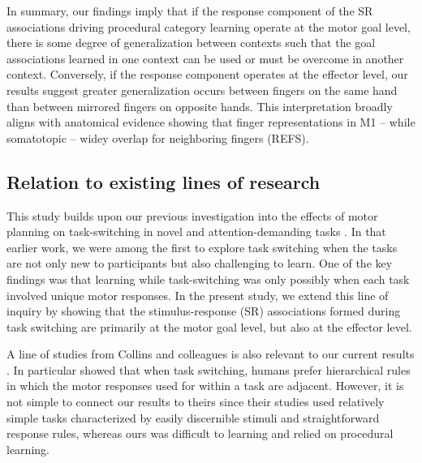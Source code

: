 \documentclass[doc, floatsintext]{apa7}
\begin{document}
In summary, our findings imply that if the response
component of the SR associations driving procedural category
learning operate at the motor goal level, there is some
degree of generalization between contexts such that the goal
associations learned in one context can be used or must be
overcome in another context. Conversely, if the response
component operates at the effector level, our results
suggest greater generalization occurs between fingers on the
same hand than between mirrored fingers on opposite hands.
This interpretation broadly aligns with anatomical evidence
showing that finger representations in M1 -- while
somatotopic -- widey overlap for neighboring fingers (REFS).

% 
% 
% 

\subsection{Relation to existing lines of research}
This study builds upon our previous investigation into the
effects of motor planning on task-switching in novel and
attention-demanding tasks \parencite{crossley_switch_2023,
crossley_trial-by-trial_2018, turner_hierarchical_2017}.  In
that earlier work, we were among the first to explore task
switching when the tasks are not only new to participants
but also challenging to learn.  One of the key findings was
that learning while task-switching was only possibly when
each task involved unique motor responses.  In the present
study, we extend this line of inquiry by showing that the
stimulus-response (SR) associations formed during task
switching are primarily at the motor goal level, but also at
the effector level. 

A line of studies from Collins and colleagues is also
relevant to our current results
\parencite{collins_cognitive_2013, collins_human_2014,
collins_neural_2016, collins_motor_2016, collins_cost_2017}.
In particular \textcite{collins_motor_2016} showed that when
task switching, humans prefer hierarchical rules in which
the motor responses used for within a task are adjacent.
However, it is not simple to connect our results to theirs
since their studies used relatively simple tasks
characterized by easily discernible stimuli and
straightforward response rules, whereas ours was difficult
to learning and relied on procedural learning.
\end{document}
